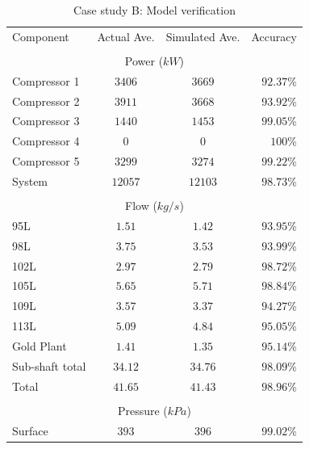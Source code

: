 \begin{appendices}
\newpage
\begin{table}[h!]
	\centering
	\begin{tabular}{lccr}
		\hline 
		Component & Actual Ave. & Simulated  Ave. & Accuracy \\ \hhline{====} 
		\\
		\multicolumn{4}{c}{Power ($ kW $)}
		\\
		Compressor 1 & $ 3406 $ & $ 3669 $ & $ 92.37 $\% \\
		Compressor 2 & $ 3911 $ & $ 3668 $ & $ 93.92 $\% \\
		Compressor 3 & $ 1440 $ & $ 1453 $ & $ 99.05 $\% \\
		Compressor 4 & $  0   $ & $  0   $ & $ 100   $\% \\
		Compressor 5 & $ 3299 $ & $ 3274 $ & $ 99.22 $\% \\
		System       & $12057 $ & $12103 $ & $ 98.73 $\% \\
		\\
		\multicolumn{4}{c}{Flow ($ kg/s $)}
		\\
		
		95L  & $ 1.51 $ & $ 1.42 $ & $ 93.95 $\% \\
		98L  & $ 3.75 $ & $ 3.53 $ & $ 93.99 $\% \\
		102L  & $ 2.97 $ & $ 2.79 $ & $ 98.72 $\% \\
		105L  & $ 5.65 $ & $ 5.71 $ & $ 98.84 $\% \\
		109L  & $ 3.57 $ & $ 3.37 $ & $ 94.27 $\% \\
		113L  & $ 5.09 $ & $ 4.84 $ & $ 95.05 $\% \\
		Gold Plant & $ 1.41 $ & $ 1.35 $ & $ 95.14 $\% \\
		Sub-shaft total & $ 34.12 $ & $ 34.76 $ & $ 98.09 $\% \\
		Total & $ 41.65$  & $41.43 $  & $ 98.96 $\% \\
		\\
		\multicolumn{4}{c}{Pressure ($ kPa $)}
		\\
		
		Surface & $ 393 $ & $ 396 $ & $ 99.02 $\% \\
		\hline 
	\end{tabular}
	\caption{Case study B: Model verification}
	\label{Table: B verification}
\end{table}


\end{appendices}
